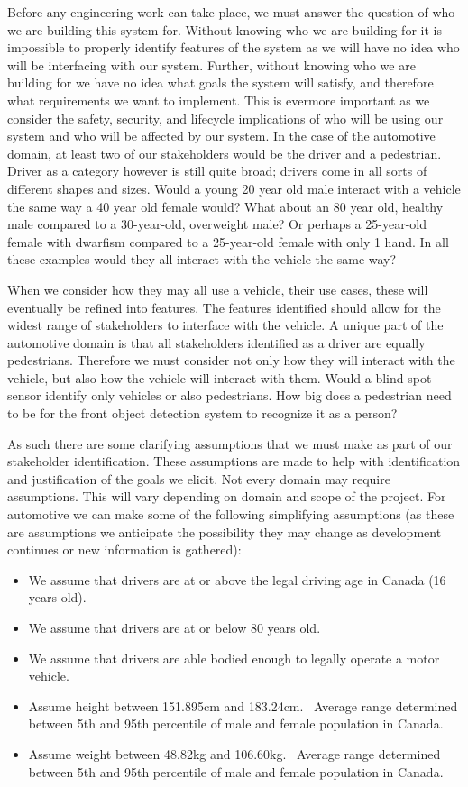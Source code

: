 Before any engineering work can take place, we must answer the question of who we are building this system for. Without knowing who we are building for it is impossible to properly identify features of the system as we will have no idea who will be interfacing with our system. Further, without knowing who we are building for we have no idea what goals the system will satisfy, and therefore what requirements we want to implement. This is evermore important as we consider the safety, security, and lifecycle implications of who will be using our system and who will be affected by our system. In the case of the automotive domain, at least two of our stakeholders would be the driver and a pedestrian. Driver as a category however is still quite broad; drivers come in all sorts of different shapes and sizes. Would a young 20 year old male interact with a vehicle the same way a 40 year old female would? What about an 80 year old, healthy male compared to a 30-year-old, overweight male? Or perhaps a 25-year-old female with dwarfism compared to a 25-year-old female with only 1 hand. In all these examples would they all interact with the vehicle the same way? 

When we consider how they may all use a vehicle, their use cases, these will eventually be refined into features. The features identified should allow for the widest range of stakeholders to interface with the vehicle. A unique part of the automotive domain is that all stakeholders identified as a driver are equally pedestrians. Therefore we must consider not only how they will interact with the vehicle, but also how the vehicle will interact with them. Would a blind spot sensor identify only vehicles or also pedestrians. How big does a pedestrian need to be for the front object detection system to recognize it as a person? 

As such there are some clarifying assumptions that we must make as part of our stakeholder identification. These assumptions are made to help with identification and justification of the goals we elicit. Not every domain may require assumptions. This will vary depending on domain and scope of the project. For automotive we can make some of the following simplifying assumptions (as these are assumptions we anticipate the possibility they may change as development continues or new information is gathered):
\begin{itemize}
	\item We assume that drivers are at or above the legal driving age in Canada (16 years old).
	\item We assume that drivers are at or below 80 years old.
	\item We assume that drivers are able bodied enough to legally operate a motor vehicle.
	\item Assume height between 151.895cm and 183.24cm.~\cite{AgeHeightStats} Average range determined between 5th and 95th percentile of male and female population in Canada.
	\item Assume weight between 48.82kg and 106.60kg.~\cite{AgeWeightStats} Average range determined between 5th and 95th percentile of male and female population in Canada.
\end{itemize}

